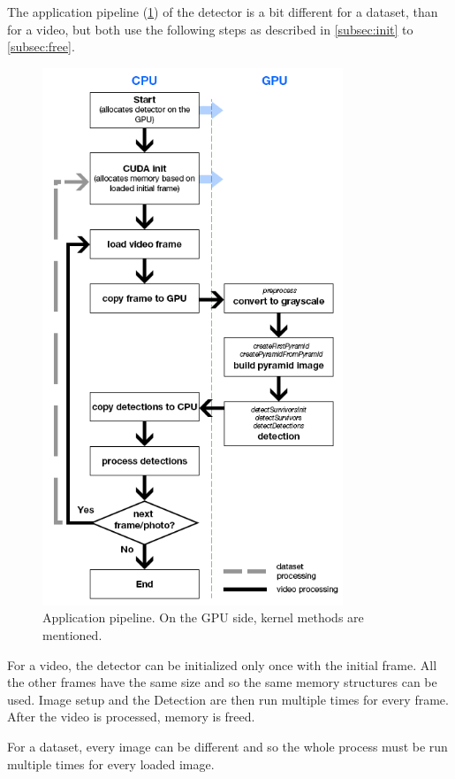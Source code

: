 The application pipeline (\ref{fig:pipeline}) of the detector is a bit different for a dataset, than for a video, but both use the following steps as described in \ref{subsec:init} to \ref{subsec:free}.

\begin{center}
\begin{figure}[h!]
	\centering\includegraphics[width=9cm]{fig/pipeline.png}
	\caption{Application pipeline. On the GPU side, kernel methods are mentioned.}
	\label{fig:pipeline}	
\end{figure}
\end{center}

For a video, the detector can be initialized only once with the initial frame. All the other frames have the same size and so the same memory structures can be used. Image setup and the Detection are then run multiple times for every frame. After the video is processed, memory is freed.

For a dataset, every image can be different and so the whole process must be run multiple times for every loaded image.

